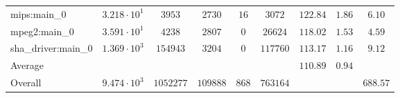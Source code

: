\begin{tabular}{|l|c|c|c|c|c|c|c|c|}
mips:main\_0            & $ 3.218 \cdot 10^{1} $ & $ 3953    $ & $ 2730   $ & $ 16  $ & $ 3072   $ & $ 122.84      $ & $ 1.86    $ & $ 6.10    $ \\
mpeg2:main\_0           & $ 3.591 \cdot 10^{1} $ & $ 4238    $ & $ 2807   $ & $ 0   $ & $ 26624  $ & $ 118.02      $ & $ 1.53    $ & $ 4.59    $ \\
sha\_driver:main\_0     & $ 1.369 \cdot 10^{3} $ & $ 154943  $ & $ 3204   $ & $ 0   $ & $ 117760 $ & $ 113.17      $ & $ 1.16    $ & $ 9.12    $ \\
\hline
Average                 & $                    $ & $         $ & $        $ & $     $ & $        $ & $ 110.89      $ & $ 0.94    $ & $         $ \\
\hline
Overall                 & $ 9.474 \cdot 10^{3} $ & $ 1052277 $ & $ 109888 $ & $ 868 $ & $ 763164 $ & $             $ & $         $ & $ 688.57  $ \\
\hline
\end{tabular}
